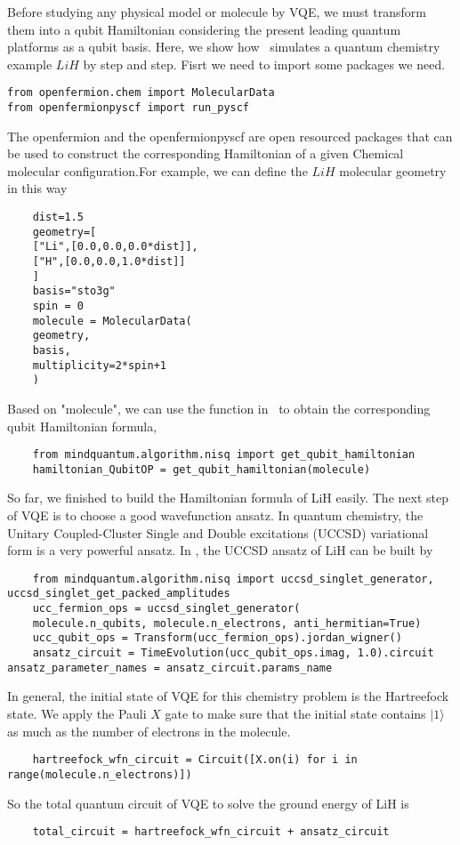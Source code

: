 Before studying any physical model or molecule by VQE, we must transform them into a qubit Hamiltonian considering the present leading quantum platforms as a qubit basis.
Here, we show how \MindQuantum\ simulates a quantum chemistry example $LiH$ by step and step. 
Fisrt we need to import some packages we need.
\begin{lstlisting}
from openfermion.chem import MolecularData
from openfermionpyscf import run_pyscf
\end{lstlisting}
The openfermion and the openfermionpyscf are open resourced packages that can be used to construct the corresponding Hamiltonian of a given Chemical molecular configuration.For example, we can define the $LiH$ molecular geometry in this way
\begin{lstlisting}
    dist=1.5
    geometry=[
    ["Li",[0.0,0.0,0.0*dist]],
    ["H",[0.0,0.0,1.0*dist]]
    ]
    basis="sto3g"
    spin = 0
    molecule = MolecularData(
    geometry,
    basis,
    multiplicity=2*spin+1
    )
\end{lstlisting}
Based on "molecule", we can use the function in \MindQuantum\ to obtain the corresponding qubit Hamiltonian formula,
\begin{lstlisting}
    from mindquantum.algorithm.nisq import get_qubit_hamiltonian
    hamiltonian_QubitOP = get_qubit_hamiltonian(molecule)
\end{lstlisting}
So far, we finished to build the Hamiltonian formula of LiH easily.
The next step of VQE is to choose a good wavefunction ansatz. In quantum chemistry, the Unitary Coupled-Cluster Single and Double excitations (UCCSD) variational form is a very powerful ansatz. In \MindQuantum, the UCCSD ansatz of LiH can be built by
\begin{lstlisting}
    from mindquantum.algorithm.nisq import uccsd_singlet_generator, uccsd_singlet_get_packed_amplitudes
    ucc_fermion_ops = uccsd_singlet_generator(
    molecule.n_qubits, molecule.n_electrons, anti_hermitian=True)
    ucc_qubit_ops = Transform(ucc_fermion_ops).jordan_wigner()
    ansatz_circuit = TimeEvolution(ucc_qubit_ops.imag, 1.0).circuit
ansatz_parameter_names = ansatz_circuit.params_name
\end{lstlisting}
In general, the initial state of VQE for this chemistry problem is the Hartreefock state. We apply the Pauli $X$ gate to make sure that the initial state contains $|1\rangle$ as much as the number of electrons in the molecule.
\begin{lstlisting}
    hartreefock_wfn_circuit = Circuit([X.on(i) for i in range(molecule.n_electrons)])
\end{lstlisting}
So the total quantum circuit of VQE to solve the ground energy of LiH is
\begin{lstlisting}
    total_circuit = hartreefock_wfn_circuit + ansatz_circuit
\end{lstlisting}


